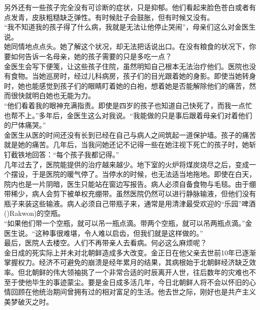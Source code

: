\begin{multicols}{\theparacolNo}
另外还有一些孩子完全没有可诊断的症状，只是抑郁。他们看起来脸色苍白或者有点发青，皮肤粗糙缺乏弹性。有时候肚子会鼓胀，但有时候又没有。\\

“我不知道我的孩子得了什么病，我就是无法让他停止哭闹”，母亲们这么对金医生说。\\

她同情地点点头。她了解这个状况，却无法把话说出口。在没有粮食的状况下，你要如何告诉一名母亲，她的孩子需要的只是多吃一点？\\

金医生会写下便笺，让这些孩子住院，虽然明知自己根本无法治疗他们。医院也没有食物。当她巡房时，经过儿科病房，孩子们的目光跟着她的身影。即使当她转身时，她也能感觉到孩子们的眼睛盯着她的白袍，想着她是否能解除他们的痛苦，然而很快就明白她也无能为力。\\

“他们看着我的眼神充满指责。即使是四岁的孩子也知道自己快死了，而我一点忙也帮不上。”多年后，金医生这么对我说。“我能做的只是事后跟着母亲们对着他们的尸体痛哭。”\\

金医生从医的时间还没有长到已经在自己与病人之间筑起一道保护墙。孩子的痛苦就是她的痛苦。几年后，当我问她还记不记得一些在她注视下死亡的孩子时，她斩钉截铁地回答：“每个孩子我都记得。”\\

几年过去了，医院能提供的治疗越来越少。地下室的火炉将煤炭烧尽之后，变成一个摆设，于是医院的暖气停了。当停水的时候，也无法适当地拖地。即使在白天，院内也是一片阴暗，医生只能站在窗边写报告。病人必须自备食物与毛毯。由于绷带稀少，病人会剪下被单权充绷带。虽然医院仍然可以进行静脉输液，但他们没有瓶子来装这些输液。病人必须自己带瓶子来，通常是用清津最受欢迎的“乐园”啤酒()Rakwon)的空瓶。\\

“如果他们带一个空瓶，就可以吊一瓶点滴。带两个空瓶，就可以吊两瓶点滴。”金医生说。“这种事很难堪，令人难以启齿，但我们就是这样做的。”\\

最后，医院人去楼空。人们不再带亲人去看病。何必这么麻烦呢？\\

金日成的死实际上并未对北朝鲜造成多大改变。金正日在他父亲去世前10年已逐渐掌握权力。经济不可避免的崩溃是经年累月的结果，其病根始于北朝鲜经济缺乏效率。但北朝鲜的伟大领袖挑了一个非常合适的时辰离开人世，往后数年的灾难也不至于使他毕生的事迹蒙尘。要是金日成多活几年，今日北朝鲜人将不会以怀旧的心情回顾在他统治期间曾拥有过的相对富足的生活。他去世之际，刚好也是共产主义美梦破灭之时。\\


\end{multicols}
